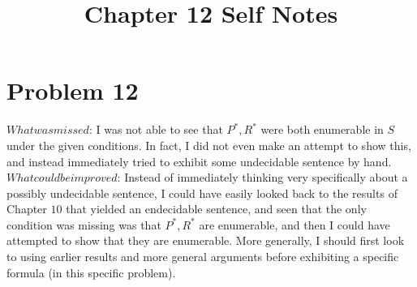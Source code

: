 \documentclass{article}
\title{Chapter 12 Self Notes}
\theoremstyle{definition}
\begin{document}
\maketitle

\section*{Problem 12}
$What was missed$: I was not able to see that $P^*, R^*$ were both enumerable in $S$ under the given conditions. In fact, I did not even make an 
attempt to show this, and instead immediately tried to exhibit some undecidable sentence by hand.
$What could be improved$: Instead of immediately thinking very specifically about a possibly undecidable sentence, I could have easily looked back 
to the results of Chapter $10$ that yielded an endecidable sentence, and seen that the only condition was missing was that $P^*, R^*$ are enumerable, 
and then I could have attempted to show that they are enumerable. More generally, I should first look to using earlier results and more general 
arguments before exhibiting a specific formula (in this specific problem).
\end{document}
